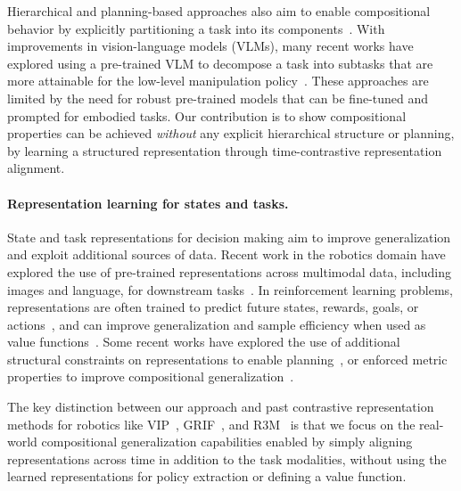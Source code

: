 Hierarchical and planning-based approaches also aim to enable compositional behavior by explicitly partitioning a task into its components~\citep{fang2022planning,myers2024policy,zhang2021c,park2023hiql}.
With improvements in vision-language models (VLMs), many recent works have explored using a pre-trained VLM to decompose a task into subtasks that are more attainable for the low-level manipulation policy~\citep{ahn2022can,attarian2022see,belkhale2024rth,kwon2023grounded,myers2024policy,singh2023progprompt,zhang2023universal}.
These approaches are limited by the need for robust pre-trained models that can be fine-tuned and prompted for embodied tasks.
Our contribution is to show compositional properties can be achieved \textit{without} any explicit hierarchical structure or planning, by learning a structured representation through time-contrastive representation alignment.

\paragraph{Representation learning for states and tasks.}State and task representations for decision making aim to improve generalization and exploit additional sources of data.
Recent work in the robotics domain have explored the use of pre-trained representations across multimodal data, including images and language, for downstream tasks~\citep{karamcheti2023languagedrivena,li2022grounded,ma2023liv,myers2023goal,nair2022r3m,pari2022surprising,shah2021rrl,cui2022can,jang2021bcz}.
In reinforcement learning problems, representations are often trained to predict future states, rewards, goals, or actions~\citep{anand2019unsupervised,ma2022vip,zhang2020learning,fan2022minedojo}, and can improve generalization and sample efficiency when used as value functions~\citep{barreto2017successor,blier2021learning,dayan1993improvinga,dosovitskiy2017learning,choi2021variational}.
Some recent works have explored the use of additional structural constraints on representations to enable planning~\citep{fang2022planning,zhang2021c,eysenbach2024inference,hafner2019learning,myers2025horizon}, or enforced metric properties to improve compositional generalization~\citep{liu2023metric,myers2024learning,wang2023optimal}.

The key distinction between our approach and past contrastive representation methods for robotics like VIP~\citep{ma2022vip}, GRIF~\citep{myers2023goal}, and R3M~\citep{nair2022r3m} is that we focus on the real-world compositional generalization capabilities enabled by simply aligning representations across time in addition to the task modalities, without using the learned representations for policy extraction or defining a value function.